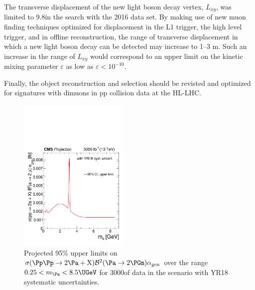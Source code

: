 The transverse displacement of the new light boson decay vertex, $L_{xy}$, was limited to 9.8\Ucm in the search with the 2016 data set. By making use of new muon finding techniques optimized for displacement in the L1 trigger, the high level trigger, and in offline reconstruction, the range of transverse displacement in which a new light boson decay can be detected may increase to {1--3 m}. %
Such an increase in the range of $L_{xy}$ would correspond to an upper limit on the kinetic mixing parameter $\varepsilon$ as low as $\varepsilon<10^{-10}$.

Finally, the object reconstruction and selection should be revisted and optimized for signatures with dimuons in pp collision data at the HL-LHC.

\begin{figure}
\centering
\includegraphics[width=0.47\textwidth]{plots/nmssm_plots_scenario_2/limit_CSxBR2xAlpha_fb_vs_mGammaD_3000.pdf}
\caption{Projected 95\% \CL upper limits on ${\sigma(\Pp\Pp \to 2 \Pa + \PX)  \mathcal{B}^2 (\Pa \to 2\PGm)  \alphaGen}$ over the range ${0.25 < \MPa < 8.5\UGeV}$ for 3000\fbinv of data in the scenario with YR18 systematic uncertainties.}
\label{fig:my_label1}
\end{figure}

